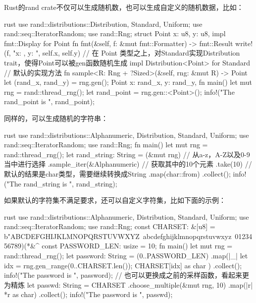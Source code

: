 Rust的rand crate不仅可以生成随机数，也可以生成自定义的随机数据，比如：
\begin{code-block}{rust}
use rand::distributions::{Distribution, Standard, Uniform};
use rand::seq::IteratorRandom;
use rand::Rng;
struct Point {
    x: u8,
    y: u8,
}
impl fmt::Display for Point {
    fn fmt(&self, f: &mut fmt::Formatter) -> fmt::Result {
        write!(f, "x: {}, y: {}", self.x, self.y)
    }
}
// 在 Point 类型之上，对Standard实现Distribution trait，使得Point可以被gen函数随机生成
impl Distribution<Point> for Standard {
    // 默认的实现方法
    fn sample<R: Rng + ?Sized>(&self, rng: &mut R) -> Point {
        let (rand_x, rand_y) = rng.gen();
        Point {
            x: rand_x,
            y: rand_y,
        }
    }
}
fn main() {
    let mut rng = rand::thread_rng();
    let rand_point = rng.gen::<Point>();
    info!("The rand_point is {}", rand_point);
}
\end{code-block}

同样的，可以生成随机的字符串：
\begin{code-block}{rust}
use rand::distributions::{Alphanumeric, Distribution, Standard, Uniform};
use rand::seq::IteratorRandom;
use rand::Rng;
fn main() {
    let mut rng = rand::thread_rng();
    let rand_string: String = (&mut rng)
        // 从a-z，A-Z以及0-9当中进行选择
        .sample_iter(&Alphanumeric)
        // 获取其中的10个元素
        .take(10)
        // 默认的结果是char类型，需要继续转换成String
        .map(char::from)
        .collect();
    info!("The rand_string is {}", rand_string);
}
\end{code-block}

如果默认的字符集不满足要求，还可以自定义字符集，比如下面的示例：
\begin{code-block}{rust}
use rand::distributions::{Alphanumeric, Distribution, Standard, Uniform};
use rand::seq::IteratorRandom;
use rand::Rng;
const CHARSET: &[u8] = b"ABCDEFGHIJKLMNOPQRSTUVWXYZ\
    abcdefghijklmnopqrstuvwxyz\
    0123456789)(*&^%
const PASSWORD_LEN: usize = 10;
fn main() {
    let mut rng = rand::thread_rng();
    let password: String = (0..PASSWORD_LEN)
        .map(|_| {
            let idx = rng.gen_range(0..CHARSET.len());
            CHARSET[idx] as char
        })
        .collect();
    info!("The password is {}", password);
    // 也可以更换成之前的采样函数，看起来更为精炼
    let passwd: String = CHARSET
        .choose_multiple(&mut rng, 10)
        .map(|r| *r as char)
        .collect();
    info!("The password is {}", passwd);
}
\end{code-block}

